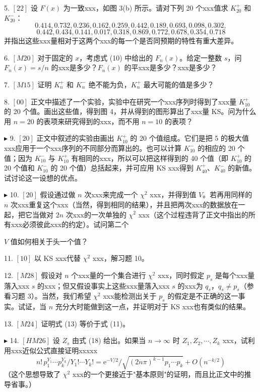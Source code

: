 5. $[22]$ 设 $F(x)$ 为一致xxx，如图 3(b) 所示。请对下列 20 个xxx值求 $K_{20}^+$ 和 $K_{20}^-$：
\[
0.414, 0.732, 0.236, 0.162, 0.259, 0.442, 0.189, 0.693, 0.098, 0.302,
\]
\[
0.442, 0.434, 0.141, 0.017, 0.318, 0.869, 0.772, 0.678, 0.354, 0.718
\]
并指出这些xxx量相对于这两个xxx的每一个是否同预期的特性有重大差异。

6. $[M20]$ 对于固定的 $x$，考虑式 (10) 中给出的 $F_n(x)$。给定一整数 $s$，问 $F_n(x) = s/n$ 的xxx是多少？$F_n(x)$ 的平xxx是多少？xxx是多少？

7. $[M15]$ 证明 $K_n^+$ 和 $K_n^-$ 绝不能为负，$K_n^+$ 最大可能的值是多少？

8. $[00]$ 正文中描述了一个实验，实验中在研究一个xxx序列时得到了xxx量 $K_{10}^+$ 的 20 个值。画出这些值，得到图 4，并从得到的图形算出了xxx量 KS。问为什么用 $n = 20$ 的表项来研究得到的xxx，而不用 $n = 10$ 的表项？

$\blacktriangleright$ 9. $[20]$ 正文中叙述的实验由画出 $K_{10}^+$ 的 20 个值组成。它们是把 5 的极大值xxx应用于一个xxx序列的不同部分而算出的。也可以计算 $K_{10}^-$ 的相应的 20 个值；因为 $K_{10}^-$ 与 $K_{10}^+$ 有相同的xxx，所以可以把这样得到的 40 个值（即 $K_{10}^+$ 的 20 个值和 $K_{10}^-$ 的 20 个值）总括起来，并可应用 KS xxx得到 $K_{40}^+$、$K_{40}^-$ 的新值。试讨论这一设想的优点。

$\blacktriangleright$ 10. $[20]$ 假设通过做 $n$ 次xxx来完成一个 $\chi^2$ xxx，并得到值 $V$。若再用同样的 $n$ 次xxx重复这个xxx（当然，得到相同的结果），并且把两次xxx的数据放在一起，把它当做对 $2n$ 次xxx的一次单独的 $\chi^2$ xxx（这个过程违背了正文中指出的所有xxx必须彼此xxx的约定）。试问第二个

\noindent $V$ 值如何相关于头一个值？

11. $[10]$ 以 KS xxx代替 $\chi^2$ xxx，解习题 10。

12. $[M28]$ 假设对 $n$ 个xxx量的一个集合进行 $\chi^2$ xxx，同时假定 $p_s$ 是每个xxx量落入xxx $s$ 的xxx；但又假设事实上这些xxx量落入xxx $s$ 的xxx为 $q_s$，$q_s \neq p_s$（参看习题 3）。当然，我们希望 $\chi^2$ xxx能检测出关于 $p_s$ 的假定是不正确的这一事实。试证，当 $n$ 充分大时能做到这一点，并证明对于 KS xxx也有类似的结果。

13. $[M24]$ 证明式 (13) 等价于式 (11)。

$\blacktriangleright$ 14. $[HM26]$ 设 $Z_s$ 由式 (18) 给出。如果当 $n \to \infty$ 时 $Z_1, Z_2, \cdots, Z_k$ xxx，试利用xxx近似公式直接证明xxxxx
\[
n!\,p_1^{Y_1} \cdots p_k^{Y_k} / Y_1! \cdots Y_k! = \mathrm{e}^{-V/2} / \sqrt{(2n\pi)^{k-1} p_1 \cdots p_k} + O(n^{-k/2})
\]
（这个思想导致了 $\chi^2$ xxx的一个更接近于"基本原则"的证明，而且比正文中的推导省事。）

